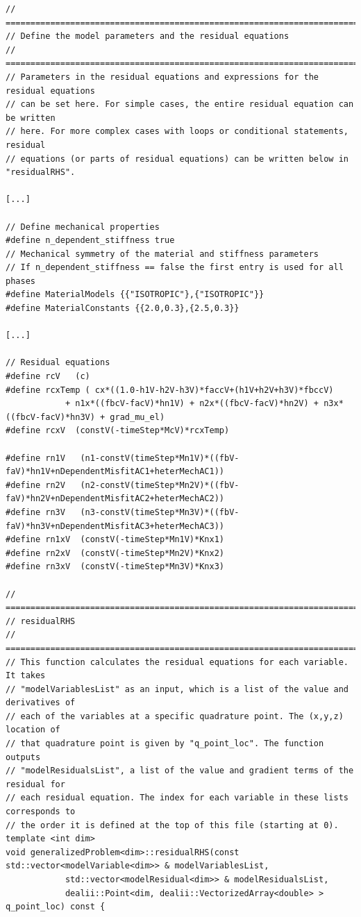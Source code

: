 \documentclass[10pt]{article} %
\begin{document}
\begin{lstlisting}
// =================================================================================
// Define the model parameters and the residual equations
// =================================================================================
// Parameters in the residual equations and expressions for the residual equations
// can be set here. For simple cases, the entire residual equation can be written
// here. For more complex cases with loops or conditional statements, residual
// equations (or parts of residual equations) can be written below in "residualRHS".

[...]

// Define mechanical properties
#define n_dependent_stiffness true
// Mechanical symmetry of the material and stiffness parameters
// If n_dependent_stiffness == false the first entry is used for all phases
#define MaterialModels {{"ISOTROPIC"},{"ISOTROPIC"}}
#define MaterialConstants {{2.0,0.3},{2.5,0.3}}

[...]

// Residual equations
#define rcV   (c)
#define rcxTemp ( cx*((1.0-h1V-h2V-h3V)*faccV+(h1V+h2V+h3V)*fbccV) 
			+ n1x*((fbcV-facV)*hn1V) + n2x*((fbcV-facV)*hn2V) + n3x*((fbcV-facV)*hn3V) + grad_mu_el)
#define rcxV  (constV(-timeStep*McV)*rcxTemp)

#define rn1V   (n1-constV(timeStep*Mn1V)*((fbV-faV)*hn1V+nDependentMisfitAC1+heterMechAC1))
#define rn2V   (n2-constV(timeStep*Mn2V)*((fbV-faV)*hn2V+nDependentMisfitAC2+heterMechAC2))
#define rn3V   (n3-constV(timeStep*Mn3V)*((fbV-faV)*hn3V+nDependentMisfitAC3+heterMechAC3))
#define rn1xV  (constV(-timeStep*Mn1V)*Knx1)
#define rn2xV  (constV(-timeStep*Mn2V)*Knx2)
#define rn3xV  (constV(-timeStep*Mn3V)*Knx3)

// =================================================================================
// residualRHS
// =================================================================================
// This function calculates the residual equations for each variable. It takes
// "modelVariablesList" as an input, which is a list of the value and derivatives of
// each of the variables at a specific quadrature point. The (x,y,z) location of
// that quadrature point is given by "q_point_loc". The function outputs
// "modelResidualsList", a list of the value and gradient terms of the residual for
// each residual equation. The index for each variable in these lists corresponds to
// the order it is defined at the top of this file (starting at 0).
template <int dim>
void generalizedProblem<dim>::residualRHS(const std::vector<modelVariable<dim>> & modelVariablesList,
			std::vector<modelResidual<dim>> & modelResidualsList,
			dealii::Point<dim, dealii::VectorizedArray<double> > q_point_loc) const {


\end{lstlisting}
\end{document}
